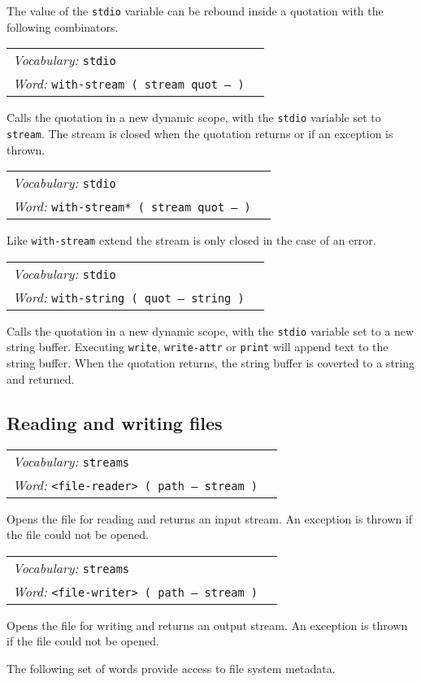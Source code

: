\documentclass{book}
\newcommand{\vocabulary}[1]{\emph{Vocabulary:} \texttt{#1}&\\}
\newcommand{\ordinaryword}[2]{\index{\texttt{#1}}\emph{Word:} \texttt{#2}&\\}
\newcommand{\wordtable}[1]{


\begin{tabularx}{12cm}{lX}
\hline
#1
\hline
\end{tabularx}

}
\begin{document}
The value of the \texttt{stdio} variable can be rebound inside a quotation with the following combinators.

\wordtable{
\vocabulary{stdio}
\ordinaryword{with-stream}{with-stream ( stream quot -- )}
}
Calls the quotation in a new dynamic scope, with the \texttt{stdio} variable set to \texttt{stream}. The stream is closed when the quotation returns or if an exception
is thrown.
\wordtable{
\vocabulary{stdio}
\ordinaryword{with-stream*}{with-stream* ( stream quot -- )}
}
Like \verb|with-stream| extend the stream is only closed in the case of an error.

\wordtable{
\vocabulary{stdio}
\ordinaryword{with-string}{with-string ( quot -- string )}

}
Calls the quotation in a new dynamic scope, with the \texttt{stdio} variable set to a new string buffer. Executing \texttt{write}, \texttt{write-attr} or \texttt{print} will append text to the string buffer. When the quotation returns, the string buffer is coverted to
a string and returned.

\subsection{Reading and writing files}

\wordtable{
\vocabulary{streams}
\ordinaryword{<file-reader>}{<file-reader> ( path -- stream )}

}
Opens the file for reading and returns an input stream. An exception is thrown if the file could not be opened.
\wordtable{
\vocabulary{streams}
\ordinaryword{<file-writer>}{<file-writer> ( path -- stream )}

}
Opens the file for writing and returns an output stream. An exception is thrown if the file could not be opened.

The following set of words provide access to file system metadata.
\end{document}
